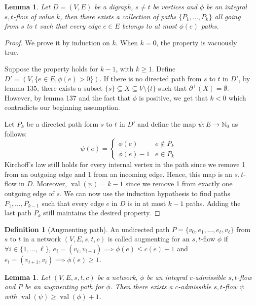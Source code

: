 \documentclass{tufte-handout}
\newtheorem{lem}[thm]{Lemma}
\theoremstyle{definition}
\newtheorem{defn}[thm]{Definition}
\theoremstyle{remark}
\newcommand{\N}{\mathbb{N}}
\DeclareMathOperator{\val}{val}
\begin{document}
\begin{lem}
	Let $D=(V,E)$ be a digraph, $s\neq t$ be vertices and $\phi$ be an integral $s,t$-flow of value $k$, then there exists a collection of paths $\{P_1, \dots, P_k\}$ all going from $s$ to $t$ such that every edge $e \in E$ belongs to at most $\phi(e)$ paths. 
\end{lem}
\begin{proof}
	We prove it by induction on $k$. When $k = 0$, the property is vacuously true.
	
	Suppose the property holds for $k-1$, with $k\geq 1$. Define $D' = (V, \{e \in E, \phi(e) > 0\})$. If there is no directed path from $s$ to $t$ in $D'$, by lemma 135, there exists a subset $\{s\} \subseteq X \subseteq V \setminus \{t\}$ such that $\partial^+(X) = \emptyset$. However, by lemma 137 and the fact that $\phi$ is positive, we get that $k<0$ which contradicts our beginning assumption.
	
	Let $P_k$ be a directed path form $s$ to $t$ in $D'$ and define the map $\psi : E \rightarrow \N_0$ as follows:
	\[ \psi(e) = \begin{cases}\phi(e) &e \notin P_k\\ \phi(e) -1 & e \in P_k\end{cases} \]
	Kirchoff's law still holds for every internal vertex in the path since we remove 1 from an outgoing edge and 1 from an incoming edge. Hence, this map is an $s,t$-flow in $D$. Moreover, $\val(\psi) = k-1$ since we remove 1 from exactly one outgoing edge of $s$. We can now use the induction hypothesis to find paths $P_1, \dots, P_{k-1}$ such that every edge $e$ in $D$ is in at most $k-1$ paths. Adding the last path $P_k$ still maintains the desired property.  
\end{proof}
\begin{defn}[Augmenting path]
	An undirected path $P = \{v_0,e_1,\dots, e_{\ell},v_{\ell}\}$ from $s$ to $t$ in a network $(V,E,s,t,c)$ is called augmenting for an $s,t$-flow $\phi$ if $\forall i \in \{1,\dots, \ell\}$, $e_i = (v_i,v_{i+1}) \implies \phi(e) \leq c(e) - 1$ and $e_i = (v_{i+1}, v_i) \implies \phi(e) \geq 1$.
\end{defn}
\begin{lem}
	Let $(V,E,s,t,c)$ be a network, $\phi$ be an integral $c$-admissible $s,t$-flow and $P$ be an augmenting path for $\phi$. Then there exists a $c$-admissible $s,t$-flow $\psi$ with $\val(\psi) \geq \val(\phi) + 1$.
\end{lem}
\end{document}
